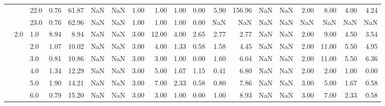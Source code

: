 \begin{tabular}{lllrrrrrrrrrrrrrrrr}
       &     & 22.0 &      0.76 &      61.87 &               NaN &                NaN &  1.00 &   1.00 &             1.00 &                         0.00 &      5.90 &     156.96 &               NaN &                NaN & 2.00 &   8.00 &             4.00 &                         4.24 \\
       &     & 23.0 &      0.76 &      62.96 &               NaN &                NaN &  1.00 &   1.00 &             1.00 &                         0.00 &       NaN &        NaN &               NaN &                NaN &  NaN &    NaN &              NaN &                          NaN \\
       & 2.0 & 1.0  &      8.94 &       8.94 &               NaN &                NaN &  3.00 &  12.00 &             4.00 &                         2.65 &      2.77 &       2.77 &               NaN &                NaN & 2.00 &   9.00 &             4.50 &                         3.54 \\
       &     & 2.0  &      1.07 &      10.02 &               NaN &                NaN &  3.00 &   4.00 &             1.33 &                         0.58 &      1.58 &       4.45 &               NaN &                NaN & 2.00 &  11.00 &             5.50 &                         4.95 \\
       &     & 3.0  &      0.81 &      10.86 &               NaN &                NaN &  3.00 &   3.00 &             1.00 &                         0.00 &      1.60 &       6.04 &               NaN &                NaN & 2.00 &  11.00 &             5.50 &                         6.36 \\
       &     & 4.0  &      1.34 &      12.29 &               NaN &                NaN &  3.00 &   5.00 &             1.67 &                         1.15 &      0.41 &       6.80 &               NaN &                NaN & 2.00 &   2.00 &             1.00 &                         0.00 \\
       &     & 5.0  &      1.90 &      14.21 &               NaN &                NaN &  3.00 &   7.00 &             2.33 &                         0.58 &      0.80 &       7.86 &               NaN &                NaN & 3.00 &   5.00 &             1.67 &                         0.58 \\
       &     & 6.0  &      0.79 &      15.20 &               NaN &                NaN &  3.00 &   3.00 &             1.00 &                         0.00 &      1.00 &       8.93 &               NaN &                NaN & 3.00 &   7.00 &             2.33 &                         0.58 \\

\end{tabular}
